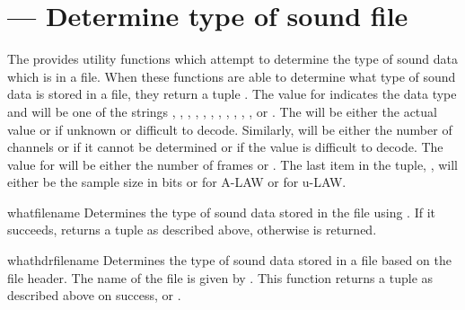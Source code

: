 \section{ ---
         Determine type of sound file}



The  provides utility functions which attempt to
determine the type of sound data which is in a file.  When these
functions are able to determine what type of sound data is stored in a
file, they return a tuple .  The value for
 indicates the data type and will be one of the strings
, , , ,
, , , ,
, , , or .  The
 will be either the actual value or  if
unknown or difficult to decode.  Similarly,  will be
either the number of channels or  if it cannot be determined
or if the value is difficult to decode.  The value for 
will be either the number of frames or .  The last item in
the tuple, , will either be the sample size in
bits or  for A-LAW or  for
u-LAW.


\begin{funcdesc}{what}{filename}
  Determines the type of sound data stored in the file 
  using .  If it succeeds, returns a tuple as
  described above, otherwise  is returned.
\end{funcdesc}


\begin{funcdesc}{whathdr}{filename}
  Determines the type of sound data stored in a file based on the file 
  header.  The name of the file is given by .  This
  function returns a tuple as described above on success, or
  .
\end{funcdesc}
